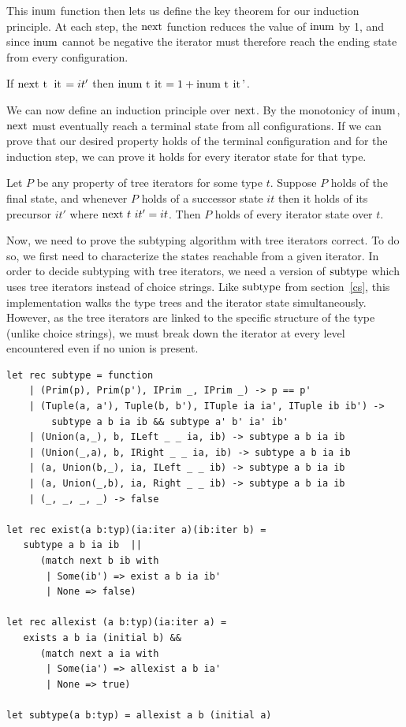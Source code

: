 \documentclass[a4paper,english]{lipics-v2019}
\renewcommand{\c}[1]{\ensuremath{\text{\lstinline{#1}}}\xspace}
\begin{document}
This \c{inum} function then lets us define the key theorem for our
induction principle. At each step, the \c{next} function reduces the
value of \c{inum} by 1, and since \c{inum} cannot be negative the
iterator must therefore reach the ending state from every configuration.

\begin{lemma}
If $\c{next t it} = it'$ then $\c{inum t it} = 1 + \c{inum t it'}$.
\end{lemma}

We can now define an induction principle over \c{next}. By the
monotonicy of \c{inum}, \c{next} must eventually reach a terminal state
from all configurations. If we can prove that our desired property holds
of the terminal configuration and for the induction step, we can prove it
holds for every iterator state for that type.

\begin{theorem}\label{indprop}
Let $P$ be any property of tree iterators for some type $t$.  Suppose $P$
holds of the final state, and whenever $P$ holds of a successor state $it$
then it holds of its precursor $it'$ where $\c{next}~t~it' = it$.  Then $P$
holds of every iterator state over $t$.
\end{theorem} 

Now, we need to prove the subtyping algorithm with tree iterators correct.
To do so, we first need to characterize the states reachable from a given iterator.
In order to decide subtyping with tree iterators, we need a version of \c{subtype} which
uses tree iterators instead of choice strings. Like \c{subtype} from section~\ref{cs}, 
this implementation walks the type trees and the iterator state simultaneously. However,
as the tree iterators are linked to the specific structure of the type (unlike choice strings), 
we must break down the iterator at every level encountered even if no union is present.

\begin{lstlisting}
let rec subtype = function
    | (Prim(p), Prim(p'), IPrim _, IPrim _) -> p == p'
    | (Tuple(a, a'), Tuple(b, b'), ITuple ia ia', ITuple ib ib') ->
        subtype a b ia ib && subtype a' b' ia' ib'
    | (Union(a,_), b, ILeft _ _ ia, ib) -> subtype a b ia ib
    | (Union(_,a), b, IRight _ _ ia, ib) -> subtype a b ia ib
    | (a, Union(b,_), ia, ILeft _ _ ib) -> subtype a b ia ib
    | (a, Union(_,b), ia, Right _ _ ib) -> subtype a b ia ib
    | (_, _, _, _) -> false

let rec exist(a b:typ)(ia:iter a)(ib:iter b) =
   subtype a b ia ib  || 
      (match next b ib with 
       | Some(ib') => exist a b ia ib' 
       | None => false)

let rec allexist (a b:typ)(ia:iter a) =
   exists a b ia (initial b) && 
      (match next a ia with 
       | Some(ia') => allexist a b ia' 
       | None => true)

let subtype(a b:typ) = allexist a b (initial a)
\end{lstlisting}
\end{document}

